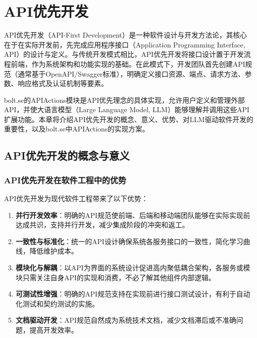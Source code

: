 
\chapter{API优先开发}

API优先开发（API-First Development）是一种软件设计与开发方法论，其核心在于在实际开发前，先完成应用程序接口（Application Programming Interface, API）的设计与定义。与传统开发模式相比，API优先开发将接口设计置于开发流程前端，作为系统架构和功能实现的基础。在此模式下，开发团队首先创建API规范（通常基于OpenAPI/Swagger标准），明确定义接口资源、端点、请求方法、参数、响应格式及认证机制等要素。

bolt.se的APIActions模块是API优先理念的具体实现，允许用户定义和管理外部API，并使大语言模型（Large Language Model, LLM）能够理解并调用这些API扩展功能。本章将介绍API优先开发的概念、意义、优势、对LLM驱动软件开发的重要性，以及bolt.se中APIActions的实现方案。

\section{API优先开发的概念与意义}

\subsection{API优先开发在软件工程中的优势}
API优先开发为现代软件工程带来了以下优势：

\begin{enumerate}
  \item \textbf{并行开发效率}：明确的API规范使前端、后端和移动端团队能够在实际实现前达成共识，支持并行开发，减少集成阶段的冲突和返工。
  
  \item \textbf{一致性与标准化}：统一的API设计确保系统各服务接口的一致性，简化学习曲线，降低维护成本。
  
  \item \textbf{模块化与解耦}：以API为界面的系统设计促进高内聚低耦合架构，各服务或模块只需关注自身API的实现和消费，不必了解其他组件内部逻辑。
  
  \item \textbf{可测试性增强}：明确的API规范支持在实现前进行接口测试设计，有利于自动化测试和契约测试的实施。
  
  \item \textbf{文档驱动开发}：API规范自然成为系统技术文档，减少文档滞后或不准确问题，提高开发效率。
\end{enumerate}

